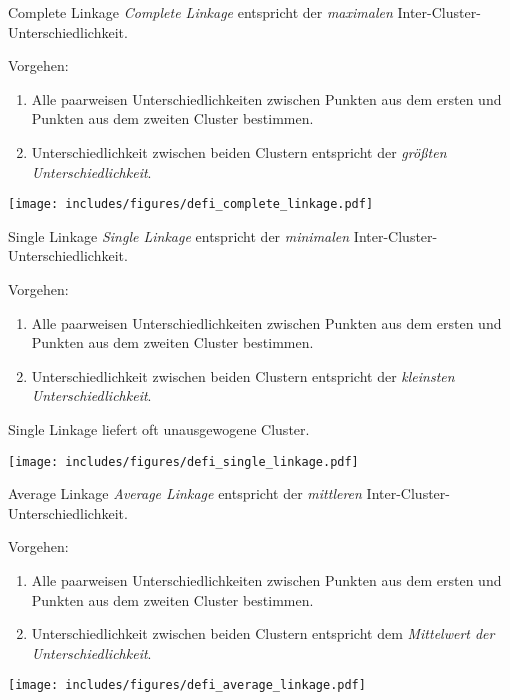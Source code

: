\begin{defi}{Complete Linkage}
    \emph{Complete Linkage} entspricht der \emph{maximalen} Inter-Cluster-Unterschiedlichkeit.

    Vorgehen:
    \begin{enumerate}
        \item Alle paarweisen Unterschiedlichkeiten zwischen Punkten aus dem ersten und Punkten aus dem zweiten Cluster bestimmen.
        \item Unterschiedlichkeit zwischen beiden Clustern entspricht der \emph{größten Unterschiedlichkeit}.
    \end{enumerate}

    \begin{center}
        \texttt{[image: includes/figures/defi\_complete\_linkage.pdf]}
    \end{center}
\end{defi}

\begin{defi}{Single Linkage}
    \emph{Single Linkage} entspricht der \emph{minimalen} Inter-Cluster-Unterschiedlichkeit.

    Vorgehen:
    \begin{enumerate}
        \item Alle paarweisen Unterschiedlichkeiten zwischen Punkten aus dem ersten und Punkten aus dem zweiten Cluster bestimmen.
        \item Unterschiedlichkeit zwischen beiden Clustern entspricht der \emph{kleinsten Unterschiedlichkeit}.
    \end{enumerate}

    Single Linkage liefert oft unausgewogene Cluster.
    \begin{center}
        \texttt{[image: includes/figures/defi\_single\_linkage.pdf]}
    \end{center}
\end{defi}

\begin{defi}{Average Linkage}
    \emph{Average Linkage} entspricht der \emph{mittleren} Inter-Cluster-Unterschiedlichkeit.

    Vorgehen:
    \begin{enumerate}
        \item Alle paarweisen Unterschiedlichkeiten zwischen Punkten aus dem ersten und Punkten aus dem zweiten Cluster bestimmen.
        \item Unterschiedlichkeit zwischen beiden Clustern entspricht dem \emph{Mittelwert der Unterschiedlichkeit}.
    \end{enumerate}

    \begin{center}
        \texttt{[image: includes/figures/defi\_average\_linkage.pdf]}
    \end{center}
\end{defi}

